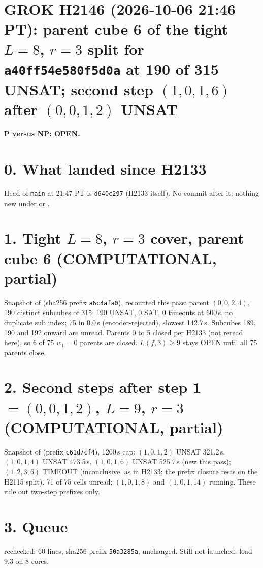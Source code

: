\documentclass[11pt]{article}
\begin{document}
\sloppy
\section*{GROK H2146 (2026-10-06 21:46 PT): parent cube 6 of the tight $L=8$, $r=3$ split for \texttt{a40ff54e580f5d0a} at 190 of 315 UNSAT; second step $(1,0,1,6)$ after $(0,0,1,2)$ UNSAT}
\textbf{P versus NP: OPEN.}

\section*{0. What landed since H2133}
Head of \texttt{main} at 21:47 PT is \texttt{d640c297} (H2133 itself). No commit after it; nothing new under  or .

\section*{1. Tight $L=8$, $r=3$ cover, parent cube 6 (COMPUTATIONAL, partial)}
Snapshot  of  (sha256 prefix \texttt{a6c4afa0}), recounted this pass: parent $(0,0,2,4)$, 190 distinct subcubes of 315, 190 UNSAT, 0 SAT, 0 timeouts at 600\,s, no duplicate sub index; 75 in 0.0\,s (encoder-rejected), slowest 142.7\,s. Subcubes 189, 190 and 192 onward are unread. Parents 0 to 5 closed per H2133 (not reread here), so 6 of 75 $w_1=0$ parents are closed. $L(f,3)\ge 9$ stays OPEN until all 75 parents close.

\section*{2. Second steps after step 1 $=(0,0,1,2)$, $L=9$, $r=3$ (COMPUTATIONAL, partial)}
Snapshot  of  (prefix \texttt{c61d7cf4}), 1200\,s cap: $(1,0,1,2)$ UNSAT 321.2\,s, $(1,0,1,4)$ UNSAT 473.5\,s, $(1,0,1,6)$ UNSAT 525.7\,s (new this pass); $(1,2,3,6)$ TIMEOUT (inconclusive, as in H2133; the prefix closure rests on the H2115 split). 71 of 75 cells unread; $(1,0,1,8)$ and $(1,0,1,14)$ running. These rule out two-step prefixes only.

\section*{3. Queue}
 rechecked: 60 lines, sha256 prefix \texttt{50a3285a}, unchanged. Still not launched: load 9.3 on 8 cores.
\end{document}
